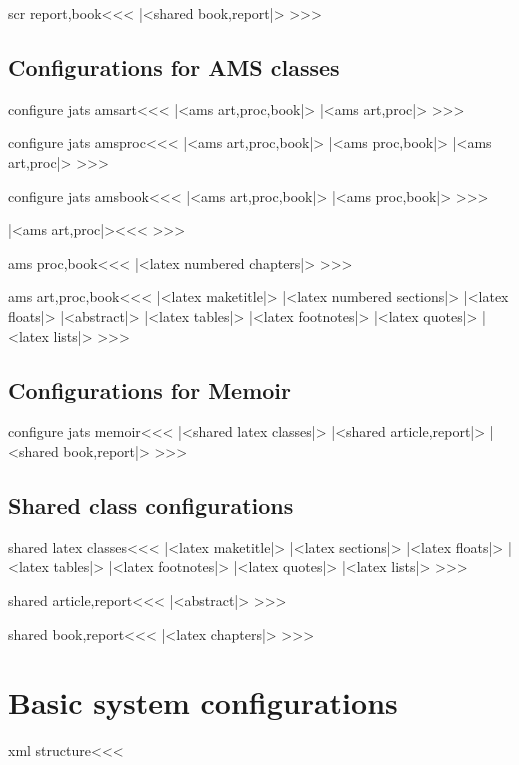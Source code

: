 \<scr report,book\><<<
|<shared book,report|>
>>>

\section{Configurations for AMS classes}

\<configure jats amsart\><<<
|<ams art,proc,book|>
|<ams art,proc|>
>>>

\<configure jats amsproc\><<<
|<ams art,proc,book|>
|<ams proc,book|>
|<ams art,proc|>
>>>

\<configure jats amsbook\><<<
|<ams art,proc,book|>
|<ams proc,book|>
>>>

|<ams art,proc|><<<
>>>

\<ams proc,book\><<<
|<latex numbered chapters|>
>>>

\<ams art,proc,book\><<<
|<latex maketitle|>
|<latex numbered sections|>
|<latex floats|>
|<abstract|>
|<latex tables|>
|<latex footnotes|>
|<latex quotes|>
|<latex lists|>
>>>

\section{Configurations for Memoir}

\<configure jats memoir\><<<
|<shared latex classes|>
|<shared article,report|>
|<shared book,report|>
>>>

\section{Shared class configurations}
\<shared latex classes\><<<
|<latex maketitle|>
|<latex sections|>
|<latex floats|>
|<latex tables|>
|<latex footnotes|>
|<latex quotes|>
|<latex lists|>
>>>

\<shared article,report\><<<
|<abstract|>
>>>

\<shared book,report\><<<
|<latex chapters|>
>>>


\chapter{Basic system configurations}

\<xml structure\><<<


